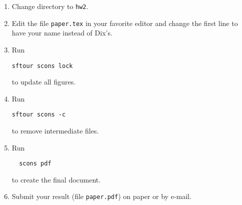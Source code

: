 \begin{enumerate}
\item Change directory to \verb#hw2#.
\item Edit the file \texttt{paper.tex} in your favorite editor and change the
  first line to have your name instead of Dix's.
\item Run
\begin{verbatim}
sftour scons lock
\end{verbatim}
to update all figures.
\item Run
\begin{verbatim}
sftour scons -c
\end{verbatim}
to remove intermediate files.
\item Run
 \begin{verbatim} 
  scons pdf
\end{verbatim}
  to create the final document.
\item Submit your result (file \texttt{paper.pdf}) on paper or by
  e-mail. 
\end{enumerate}

 

